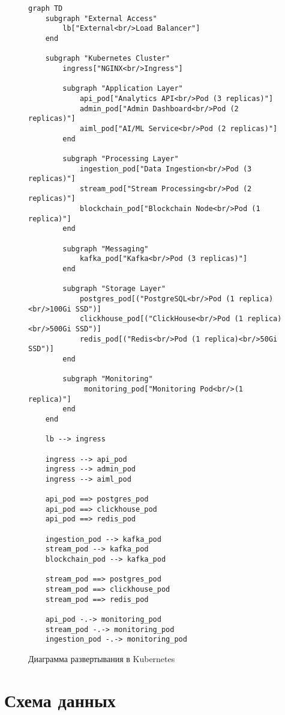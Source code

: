 \documentclass[11pt,a4paper]{article}
\begin{document}
\begin{figure}[H]
\centering
\begin{verbatim}
graph TD
    subgraph "External Access"
        lb["External<br/>Load Balancer"]
    end
    
    subgraph "Kubernetes Cluster"
        ingress["NGINX<br/>Ingress"]
        
        subgraph "Application Layer"
            api_pod["Analytics API<br/>Pod (3 replicas)"]
            admin_pod["Admin Dashboard<br/>Pod (2 replicas)"]
            aiml_pod["AI/ML Service<br/>Pod (2 replicas)"]
        end

        subgraph "Processing Layer"
            ingestion_pod["Data Ingestion<br/>Pod (3 replicas)"]
            stream_pod["Stream Processing<br/>Pod (2 replicas)"]
            blockchain_pod["Blockchain Node<br/>Pod (1 replica)"]
        end
        
        subgraph "Messaging"
            kafka_pod["Kafka<br/>Pod (3 replicas)"]
        end

        subgraph "Storage Layer"
            postgres_pod[("PostgreSQL<br/>Pod (1 replica)<br/>100Gi SSD")]
            clickhouse_pod[("ClickHouse<br/>Pod (1 replica)<br/>500Gi SSD")]
            redis_pod[("Redis<br/>Pod (1 replica)<br/>50Gi SSD")]
        end
        
        subgraph "Monitoring"
             monitoring_pod["Monitoring Pod<br/>(1 replica)"]
        end
    end

    lb --> ingress
    
    ingress --> api_pod
    ingress --> admin_pod
    ingress --> aiml_pod
    
    api_pod ==> postgres_pod
    api_pod ==> clickhouse_pod
    api_pod ==> redis_pod
    
    ingestion_pod --> kafka_pod
    stream_pod --> kafka_pod
    blockchain_pod --> kafka_pod
    
    stream_pod ==> postgres_pod
    stream_pod ==> clickhouse_pod
    stream_pod ==> redis_pod
    
    api_pod -.-> monitoring_pod
    stream_pod -.-> monitoring_pod
    ingestion_pod -.-> monitoring_pod
\end{verbatim}
\caption{Диаграмма развертывания в Kubernetes}
\label{fig:deployment-diagram}
\end{figure}

\section{Схема данных}
\end{document}
